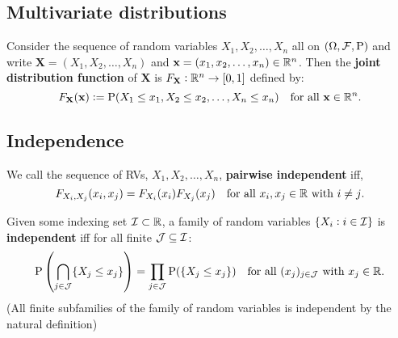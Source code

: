 \documentclass[../Year1/Year1.tex]{subfiles}
\begin{document}
\subsection{Multivariate distributions}

\begingroup\belowdisplayskip=-10pt
\begin{definition}
    Consider the sequence of random variables $X_1,X_2,\ldots,X_n$ all on $(\Omega,\mathcal{F},\mathrm{P})$ and write $\textbf{X}=(X_1,X_2,\ldots,X_n)$ and $\textbf{x}=(x_1,x_2,\ldots,x_n)\in\mathbb{R}^n$. Then the \textbf{joint distribution function} of $\textbf{X}$ is  $F_\textbf{X}:\mathbb{R}^n\rightarrow[0,1]$ defined by: \[
        F_\textbf{X}(\textbf{x}) := \mathrm{P}(X_1\leq x_1,X_2\leq x_2, \ldots, X_n \leq x_n) \quad \text{\textcolor{black}{for all }$\textbf{x}\in\mathbb{R}^n$\textcolor{black}{.}}
    \]
\end{definition}
\endgroup
\subsection{Independence}

\begingroup\belowdisplayskip=-10pt
\begin{definition}
    We call the sequence of RVs, $X_1, X_2, \ldots, X_n$, \textbf{pairwise independent} iff, \[
        F_{X_i,X_j}(x_i,x_j) = F_{X_i}(x_i)F_{X_j}(x_j) \quad \text{\textcolor{black}{for all }$x_i,x_j\in\mathbb{R}$ \textcolor{black} { with }$i\neq j$\textcolor{black}{.}}
    \]
\end{definition}
\endgroup

\begin{definition}
    Given some indexing set $\mathcal{I} \subset \mathbb{R}$, a family of random variables $\{X_i: i\in\mathcal{I}\}$ is \textbf{independent} iff for all finite $\mathcal{J}\subseteq\mathcal{I}$: \[
        \mathrm{P}\left(\bigcap_{j\in\mathcal{J}}\{X_j\leq x_j\}\right) = \prod_{j\in\mathcal{J}}\mathrm{P}(\{X_j\leq x_j\}) \quad 
    \text{\textcolor{black}{for all }$(x_j)_{j\in\mathcal{J}}$ \textcolor{black} { with }$x_j\in\mathbb{R}$\textcolor{black}{.}}
    \]
    (All finite subfamilies of the family of random variables is independent by the natural definition)
\end{definition}
\end{document}
